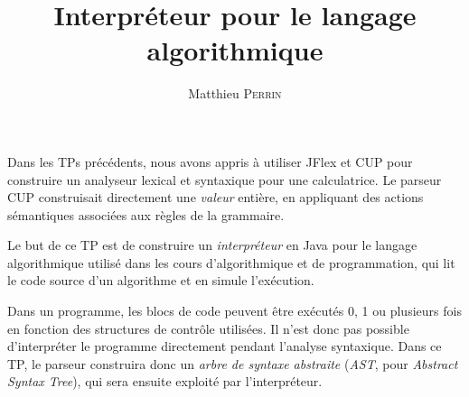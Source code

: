 \documentclass[correction]{td}
\author{Matthieu \textsc{Perrin}}
\title{Interpréteur pour le langage algorithmique}
\begin{document}
\maketitle

Dans les TPs précédents, nous avons appris à utiliser JFlex et CUP pour construire
un analyseur lexical et syntaxique pour une calculatrice.
Le parseur CUP construisait directement une \emph{valeur} entière,
en appliquant des actions sémantiques associées aux règles de la grammaire.

Le but de ce TP est de construire un \emph{interpréteur} en Java pour le langage algorithmique
utilisé dans les cours d'algorithmique et de programmation, qui lit le code source d'un algorithme
et en simule l'exécution.

Dans un programme, les blocs de code peuvent être exécutés 0, 1 ou plusieurs fois en fonction des
structures de contrôle utilisées. Il n'est donc pas possible d'interpréter le programme directement
pendant l'analyse syntaxique. Dans ce TP, le parseur construira donc un \emph{arbre de syntaxe abstraite}
(\emph{AST}, pour \emph{Abstract Syntax Tree}), qui sera ensuite exploité par l'interpréteur.
\end{document}
